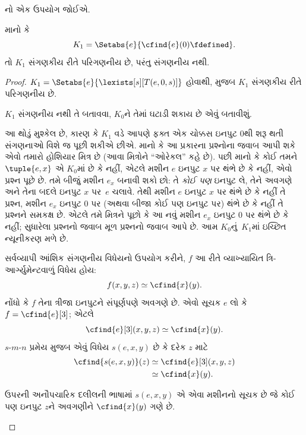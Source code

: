 \documentclass[../../../include/open-logic-section]{subfiles}
\begin{document}

નો એક ઉપયોગ જોઈએ.

\begin{prop}
માનો કે
\[
K_1 = \Setabs{e}{\cfind{e}(0) \fdefined}.
\]
તો $K_1$ સંગણકીય રીતે પરિગણનીય છે, પરંતુ સંગણનીય નથી.
\end{prop}

\begin{proof}
$K_1 = \Setabs{e}{\lexists[s][T(e,0,s)]}$ હોવાથી,
 મુજબ $K_1$ સંગણકીય રીતે
પરિગણનીય છે.

$K_1$ સંગણનીય નથી તે બતાવવા, $K_0$ને તેમાં ઘટાડી શકાય
છે એવું બતાવીશું.

\begin{explain}
આ થોડું મુશ્કેલ છે, કારણ કે $K_1$ વડે આપણે ફક્ત એક
ચોક્કસ ઇનપુટ $0$થી શરૂ થતી સંગણનાઓ વિશે જ પૂછી શકીએ છીએ.
માનો કે આ પ્રકારના પ્રશ્નોના જવાબ આપી શકે એવો તમારો હોશિયાર
મિત્ર છે (આવા મિત્રોને ``ઓરેકલ'' કહે છે). પછી માનો કે
કોઈ તમને $\tuple{e, x}$ એ $K_0$માં છે કે નહીં,
એટલે મશીન $e$ ઇનપુટ $x$ પર થંભે છે કે નહીં, એવો પ્રશ્ન
પૂછે છે. તમે બીજું મશીન $e_x$ બનાવી શકો છો: તે
\emph{કોઈ પણ} ઇનપુટ લે, તેને અવગણે અને તેના બદલે
ઇનપુટ $x$ પર~$e$ ચલાવે. તેથી મશીન $e$ ઇનપુટ $x$ પર
થંભે છે કે નહીં તે પ્રશ્ન, મશીન $e_x$ ઇનપુટ $0$ પર
(અથવા બીજા કોઈ પણ ઇનપુટ પર) થંભે છે કે નહીં તે પ્રશ્નને
સમકક્ષ છે. એટલે તમે મિત્રને પૂછો કે આ નવું મશીન $e_x$
ઇનપુટ $0$ પર થંભે છે કે નહીં; સુધારેલા પ્રશ્નનો જવાબ
મૂળ પ્રશ્નનો જવાબ આપે છે. આમ $K_0$નું~$K_1$માં ઇચ્છિત
ન્યૂનીકરણ મળે છે.
\end{explain}

સર્વવ્યાપી આંશિક સંગણનીય વિધેયનો ઉપયોગ કરીને, $f$ આ રીતે
વ્યાખ્યાયિત ત્રિ-આર્ગ્યુમેન્ટવાળું વિધેય હોય:
\[
f(x,y,z) \simeq \cfind{x}(y).
\]
નોંધો કે $f$ તેના ત્રીજા ઇનપુટને સંપૂર્ણપણે અવગણે છે.
એવો સૂચક $e$ લો કે $f = \cfind{e}[3]$; એટલે
\[
\cfind{e}[3](x,y,z) \simeq \cfind{x}(y).
\]
$s$-$m$-$n$ પ્રમેય મુજબ એવું વિધેય $s(e,x,y)$ છે કે
દરેક $z$ માટે
\begin{align*}
\cfind{s(e,x,y)}(z) & \simeq \cfind{e}[3](x,y,z) \\
& \simeq \cfind{x}(y).
\end{align*}

\begin{explain}
ઉપરની અનૌપચારિક દલીલની ભાષામાં $s(e,x,y)$ એ એવા મશીનનો
સૂચક છે જે કોઈ પણ ઇનપુટ $z$ને અવગણીને $\cfind{x}(y)$
ગણે છે.
\end{explain}


\end{proof}
\end{document}
